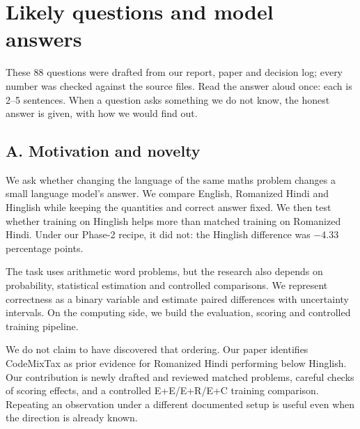 \section{Likely questions and model answers}
These 88 questions were drafted from our report, paper and decision log; every number was checked against the source files. Read the answer aloud once: each is 2--5 sentences. When a question asks something we do not know, the honest answer is given, with how we would find out.

\subsection*{A. Motivation and novelty}


\medskip{}\par\nopagebreak

We ask whether changing the language of the same maths problem changes a small language model's answer. We compare English, Romanized Hindi and Hinglish while keeping the quantities and correct answer fixed. We then test whether training on Hinglish helps more than matched training on Romanized Hindi. Under our Phase-2 recipe, it did not: the Hinglish difference was −4.33 percentage points.

\medskip{}\par\nopagebreak

The task uses arithmetic word problems, but the research also depends on probability, statistical estimation and controlled comparisons. We represent correctness as a binary variable and estimate paired differences with uncertainty intervals. On the computing side, we build the evaluation, scoring and controlled training pipeline.

\medskip{}\par\nopagebreak

We do not claim to have discovered that ordering. Our paper identifies CodeMixTax as prior evidence for Romanized Hindi performing below Hinglish. Our contribution is newly drafted and reviewed matched problems, careful checks of scoring effects, and a controlled E+E/E+R/E+C training comparison. Repeating an observation under a different documented setup is useful even when the direction is already known.

